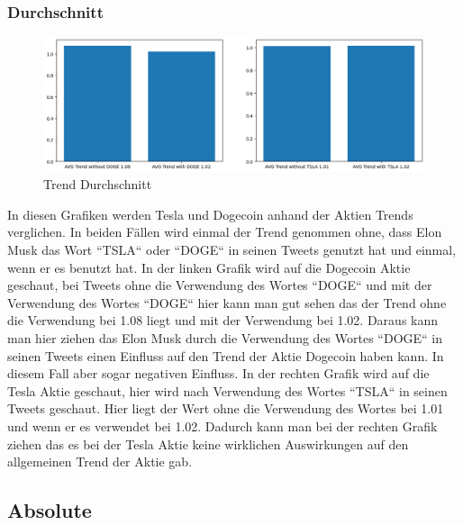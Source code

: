\documentclass{article}
\begin{document}
\subsubsection{Durchschnitt}
\begin{figure}[!htb]
  	\includegraphics[width=\textwidth, center]{../imgs/Trend_Durchschnitt.png}
 	\caption{Trend Durchschnitt}
 	\label{fig:Trend Durchschnitt}
\end{figure}
In diesen Grafiken werden Tesla und Dogecoin anhand der Aktien Trends verglichen. In beiden Fällen wird einmal der Trend genommen ohne, dass Elon Musk das Wort “TSLA“ oder “DOGE“ in seinen Tweets genutzt hat und einmal, wenn er es benutzt hat.
In der linken Grafik wird auf die Dogecoin Aktie geschaut, bei Tweets ohne die Verwendung des Wortes “DOGE“ und mit der Verwendung des Wortes “DOGE“ hier kann man gut sehen das der Trend ohne die Verwendung bei 1.08 liegt und mit der Verwendung bei 1.02.
Daraus kann man hier ziehen das Elon Musk durch die Verwendung des Wortes “DOGE“ in seinen Tweets einen Einfluss auf den Trend der Aktie Dogecoin haben kann. In diesem Fall aber sogar negativen Einfluss.
In der rechten Grafik wird auf die Tesla Aktie geschaut, hier wird nach Verwendung des Wortes “TSLA“ in seinen Tweets geschaut. Hier liegt der Wert ohne die Verwendung des Wortes bei 1.01 und wenn er es verwendet bei 1.02.
Dadurch kann man bei der rechten Grafik ziehen das es bei der Tesla Aktie keine wirklichen Auswirkungen auf den allgemeinen Trend der Aktie gab.


\subsection{Absolute}
\end{document}
